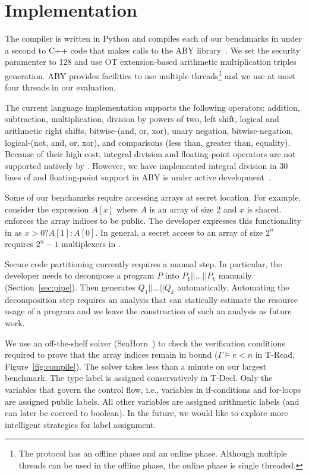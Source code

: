 \section{Implementation}
\label{sec:impl}
The  \tool compiler is written in Python and
compiles each of our benchmarks in under a second to C++ code that makes calls to the ABY
library~\cite{aby}. We set the security paramenter to 128 and use OT extension-based arithmetic multiplication triples generation. ABY provides facilities to use multiple threads\footnote{The protocol has an offline phase and an online phase. Although multiple threads can be used in the offline phase, the online phase is single threaded.} and we use at most four threads in our evaluation.

The current language implementation supports the following operators:
addition, subtraction, multiplication, division by powers of two, left shift,
logical and arithmetic right shifts, bitwise-(and, or, xor), unary negation,
bitwise-negation, logical-(not, and, or, xor), and comparisons (less than, greater than, equality).
Because of their high cost, integral division and floating-point operators are not supported natively by \tool.
However, we have implemented integral division in 30 lines of \tool and floating-point support in
ABY is under active development~\cite{ddkssz15}.


Some of our benchamrks require accessing arrays at secret location.
For example, consider the expression $A[x]$ where $A$ is an array of size 2 and $x$ is shared.
\tool enforces the array indices to be public. The developer expresses this functionality in \tool
as $x > 0 ? A[1] : A[0]$. In general, a secret access to an array of size $2^n$ requires $2^{n}-1$ multiplexers in \tool.

 Secure code partitioning currently requires a manual step.
In particular, the developer needs to decompose a program $P$ into $P_1||\ldots||P_k$ manually (Section~\ref{sec:pipe}). Then \tool generates $Q_1||\ldots||Q_k$ automatically.
Automating the decomposition step requires an analysis that can 
statically estimate the resource usage of a \tool program and we leave the construction of such
an analysis as future work.

We use an off-the-shelf solver
(SeaHorn~\cite{seahorn}) to check the verification conditions required
to prove that the array indices remain in bound ($\Gamma\vDash e < n$ in {\sc T-Read}, Figure~\ref{fig:compile}). The solver takes less
than a minute on our largest benchmark.
The type label is assigned conservatively in  {\sc T-Decl}.
Only the variables that govern the control flow, i.e., variables
in if-conditions and for-loops are assigned public labels.
All other variables are assigned arithmetic labels (and can later be coerced to boolean).
In the future, we would like to explore more intelligent strategies for label assignment.


